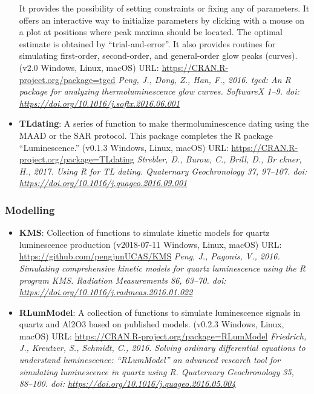 \documentclass[]{article}
\providecommand{\tightlist}{%
  \setlength{\itemsep}{0pt}\setlength{\parskip}{0pt}}
\begin{document}
\begin{itemize}
  It provides the possibility of setting constraints or fixing any of parameters.
  It offers an interactive way to initialize parameters by clicking with a mouse
  on a plot at positions where peak maxima should be located. The optimal estimate
  is obtained by ``trial-and-error''. It also provides routines for simulating
  first-order, second-order, and general-order glow peaks (curves).
  (v2.0 \textbar{} Windows, Linux, macOS)
  URL: \url{https://CRAN.R-project.org/package=tgcd}
  \emph{Peng, J., Dong, Z., Han, F., 2016. tgcd: An R package for analyzing thermoluminescence glow curves. SoftwareX 1--9. doi: \url{https://doi.org/10.1016/j.softx.2016.06.001}}
\item
  \textbf{TLdating}: A series of function to make thermoluminescence dating using the MAAD or the SAR protocol.
  This package completes the R package ``Luminescence.''
  (v0.1.3 \textbar{} Windows, Linux, macOS)
  URL: \url{https://CRAN.R-project.org/package=TLdating}
  \emph{Strebler, D., Burow, C., Brill, D., Br ckner, H., 2017. Using R for TL dating. Quaternary Geochronology 37, 97--107. doi: \url{https://doi.org/10.1016/j.quageo.2016.09.001}}
\end{itemize}

\hypertarget{modelling}{%
\subsubsection{Modelling}\label{modelling}}

\begin{itemize}
\tightlist
\item
  \textbf{KMS}: Collection of functions to simulate kinetic models for quartz luminescence production
  (v2018-07-11 \textbar{} Windows, Linux, macOS)
  URL: \url{https://github.com/pengjunUCAS/KMS}
  \emph{Peng, J., Pagonis, V., 2016. Simulating comprehensive kinetic models for quartz luminescence using the R program KMS. Radiation Measurements 86, 63--70. doi: \url{https://doi.org/10.1016/j.radmeas.2016.01.022}}
\item
  \textbf{RLumModel}: A collection of functions to simulate luminescence signals in quartz and Al2O3 based on published models.
  (v0.2.3 \textbar{} Windows, Linux, macOS)
  URL: \url{https://CRAN.R-project.org/package=RLumModel}
  \emph{Friedrich, J., Kreutzer, S., Schmidt, C., 2016. Solving ordinary differential equations to understand luminescence: ``RLumModel'' an advanced research tool for simulating luminescence in quartz using R. Quaternary Geochronology 35, 88--100. doi: \url{https://doi.org/10.1016/j.quageo.2016.05.004}}
\end{itemize}
\end{document}
